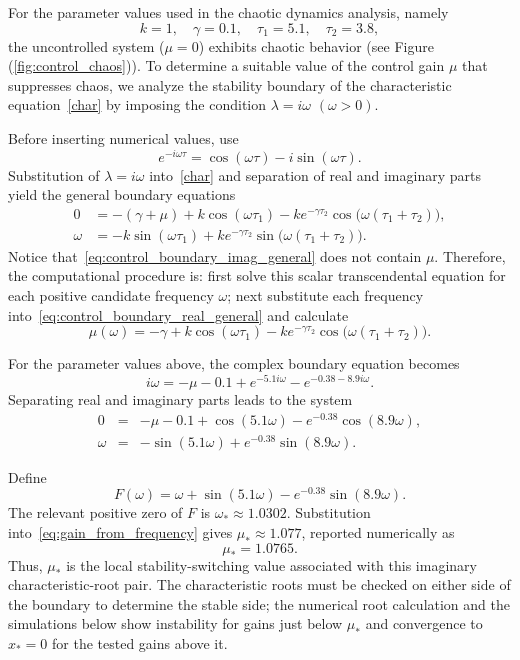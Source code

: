 \documentclass[11pt]{article}
\theoremstyle{remark}
\begin{document}
{For the parameter values used in the chaotic dynamics analysis, namely
\[
k=1,\quad \gamma=0.1,\quad \tau_1=5.1,\quad \tau_2=3.8,
\]
the uncontrolled system ($\mu=0$) exhibits chaotic behavior (see Figure (\ref{fig:control_chaos})). To determine a suitable value of the control gain $\mu$ that suppresses chaos, we analyze the stability boundary of the characteristic equation~\eqref{char} by imposing the condition $\lambda=i\omega$ $(\omega>0)$.

Before inserting numerical values, use
\[
	e^{-i\omega\tau}=\cos(\omega\tau)-i\sin(\omega\tau).
\]
Substitution of $\lambda=i\omega$ into~\eqref{char} and separation of real and imaginary parts yield the general boundary equations
\begin{align}
	0
	&=-(\gamma+\mu)
	+k\cos(\omega\tau_1)
	-k e^{-\gamma\tau_2}\cos\bigl(\omega(\tau_1+\tau_2)\bigr),
	\label{eq:control_boundary_real_general}\\
	\omega
	&=-k\sin(\omega\tau_1)
	+k e^{-\gamma\tau_2}\sin\bigl(\omega(\tau_1+\tau_2)\bigr).
	\label{eq:control_boundary_imag_general}
\end{align}
Notice that~\eqref{eq:control_boundary_imag_general} does not contain $\mu$. Therefore, the computational procedure is: first solve this scalar transcendental equation for each positive candidate frequency $\omega$; next substitute each frequency into~\eqref{eq:control_boundary_real_general} and calculate
\begin{equation}
	\mu(\omega)
	=-\gamma
	+k\cos(\omega\tau_1)
	-k e^{-\gamma\tau_2}\cos\bigl(\omega(\tau_1+\tau_2)\bigr).
	\label{eq:gain_from_frequency}
\end{equation}

For the parameter values above, the complex boundary equation becomes
\[
i\omega
= -\mu - 0.1
+ e^{-5.1 i\omega}
- e^{-0.38-8.9 i\omega}.
\]
Separating real and imaginary parts leads to the system
\begin{eqnarray}
	0 &=& -\mu - 0.1 + \cos(5.1\omega) - e^{-0.38}\cos(8.9\omega), \label{real} \\
	\omega &=& -\sin(5.1\omega) + e^{-0.38}\sin(8.9\omega). \label{imag}
\end{eqnarray}

Define
\[
	F(\omega)
	=\omega+\sin(5.1\omega)-e^{-0.38}\sin(8.9\omega).
\]
The relevant positive zero of $F$ is $\omega_*\approx1.0302$. Substitution into~\eqref{eq:gain_from_frequency} gives $\mu_*\approx1.077$, reported numerically as
\[
	\mu_*=1.0765.
\]
Thus, $\mu_*$ is the local stability-switching value associated with this imaginary characteristic-root pair. The characteristic roots must be checked on either side of the boundary to determine the stable side; the numerical root calculation and the simulations below show instability for gains just below $\mu_*$ and convergence to $x_*=0$ for the tested gains above it.
}
\end{document}
